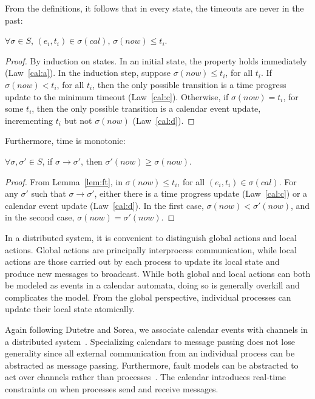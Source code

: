 \documentclass{llncs/llncs}
\begin{document}
From the definitions, it follows that in every state, the timeouts are never in the past:
\begin{lemma}\label{lem:ft}
$\forall \sigma \in S$, $(e_i, t_i) \in \sigma(cal)$, $\sigma(now) \leq t_i$.
\end{lemma}
\begin{proof}
By induction on states. In an initial state, the property holds immediately (Law~\ref{cal:a}). In the induction step, suppose $\sigma(now) \leq t_i$, for all $t_i$. If $\sigma(now) < t_i$, for all $t_i$, then the only possible transition is a time progress update to the minimum timeout (Law~\ref{cal:c}). Otherwise, if $\sigma(now) = t_i$, for some $t_i$, then the only possible transition is a calendar event update, incrementing $t_i$ but not $\sigma(now)$ (Law~\ref{cal:d}).
\end{proof}

\noindent
Furthermore, time is monotonic:
\begin{lemma}
$\forall \sigma, \sigma' \in S$, if $\sigma \rightarrow \sigma'$, then $\sigma'(now) \geq \sigma(now)$.
\end{lemma}
\begin{proof}
From Lemma~\ref{lem:ft}, in $\sigma(now) \leq t_i$, for all $(e_i, t_i) \in \sigma(cal)$. For any $\sigma'$ such that $\sigma \rightarrow \sigma'$, either there is a time progress update (Law~\ref{cal:c}) or a calendar event update (Law~\ref{cal:d}). In the first case, $\sigma(now) < \sigma'(now)$, and in the second case, $\sigma(now) = \sigma'(now)$.
\end{proof}

In a distributed system, it is convenient to distinguish global actions and local actions. Global actions are principally interprocess communication, while local actions are those carried out by each process to update its local state and produce new messages to broadcast. While both global and local actions can both be modeled as events in a calendar automata, doing so is generally overkill and complicates the model. From the global perspective, individual processes can update their local state atomically.

Again following Dutetre and Sorea, we associate calendar events with channels in a distributed system~\cite{dutetre}. Specializing calendars to message passing does not lose generality since all external communication from an individual process can be abstracted as message passing. Furthermore, fault models can be abstracted to act over channels rather than processes~\cite{abstractions}. The calendar introduces real-time constraints on when processes send and receive messages.
\end{document}
